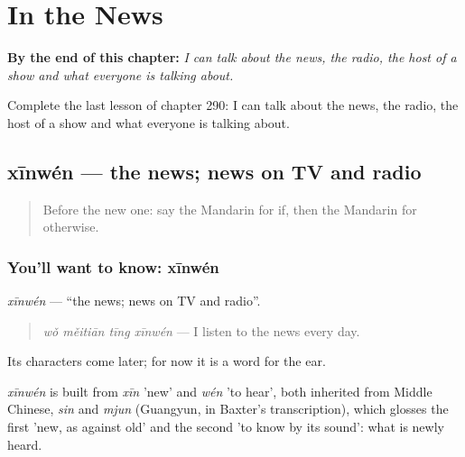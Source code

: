 
\chapter{In the News}
\label{ch:zh-in-the-news}

\begin{chapteropening}
\textbf{By the end of this chapter:} \emph{I can talk about the news, the radio, the host of a show and what everyone is talking about.}

Complete the last lesson of chapter 290: I can talk about the news, the radio, the host of a show and what everyone is talking about.
\end{chapteropening}

\section[xīnwén]{xīnwén — the news; news on TV and radio}

\label{lesson:ZH-C290-xinwen}



\begin{quote}
Before the new one: say the Mandarin for if, then the Mandarin for otherwise.
\end{quote}

\subsection*{You'll want to know: xīnwén}
\emph{xīnwén} — \textquotedblleft{}the news; news on TV and radio\textquotedblright{}.

\begin{quote}
\emph{wǒ měitiān tīng xīnwén} — I listen to the news every day.
\end{quote}

Its characters come later; for now it is a word for the ear.

\begin{cousinweb}
\emph{xīnwén} is built from \emph{xīn} 'new' and \emph{wén} 'to hear', both inherited from Middle Chinese, \emph{sin} and \emph{mjun} (Guangyun, in Baxter's transcription), which glosses the first 'new, as against old' and the second 'to know by its sound': what is newly heard.
\end{cousinweb}

